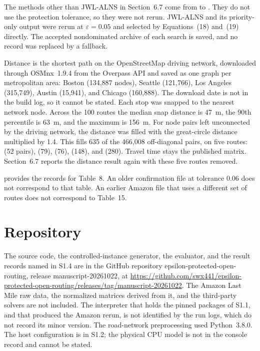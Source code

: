 \documentclass[11pt,a4paper]{article}
\begin{document}
The methods other than JWL-ALNS in Section~6.7 come from  to . They do not use the protection tolerance, so they were not rerun. JWL-ALNS and its priority-only output were rerun at $\varepsilon=0.05$ and selected by Equations~(18) and~(19) directly. The accepted nondominated archive of each search is saved, and no record was replaced by a fallback.

Distance is the shortest path on the OpenStreetMap driving network, downloaded through OSMnx~1.9.4 from the Overpass API and saved as one graph per metropolitan area: Boston (134,887 nodes), Seattle (121,766), Los Angeles (315,749), Austin (15,941), and Chicago (160,888). The download date is not in the build log, so it cannot be stated. Each stop was snapped to the nearest network node. Across the 100 routes the median snap distance is 47~m, the 90th percentile is 63~m, and the maximum is 156~m. For node pairs left unconnected by the driving network, the distance was filled with the great-circle distance multiplied by 1.4. This fills 635 of the 466,008 off-diagonal pairs, on five routes:  (52 pairs),  (79),  (76),  (148), and  (280). Travel time stays the published matrix. Section~6.7 reports the distance result again with these five routes removed.

 provides the records for Table~8. An older confirmation file at tolerance 0.06 does not correspond to that table. An earlier Amazon file that uses a different set of routes does not correspond to Table~15.

\section{Repository}

The source code, the controlled-instance generator, the evaluator, and the result records named in S1.4 are in the GitHub repository epsilon-protected-open-routing, release manuscript-20261022, at \url{https://github.com/swx441/epsilon-protected-open-routing/releases/tag/manuscript-20261022}. The Amazon Last Mile raw data, the normalized matrices derived from it, and the third-party solvers are not included. The interpreter that holds the pinned packages of S1.1, and that produced the Amazon rerun, is not identified by the run logs, which do not record its minor version. The road-network preprocessing used Python~3.8.0. The host configuration is in S1.2; the physical CPU model is not in the console record and cannot be stated.
\end{document}
